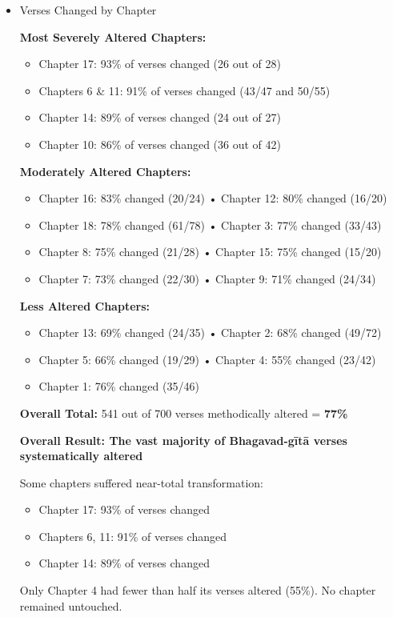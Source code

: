 \documentclass[11pt,twoside]{book}
\begin{document}
\newpage
\begin{itemize}
\item Verses Changed by Chapter
\label{sec:orgeeb8808}

\textbf{\textbf{Most Severely Altered Chapters:}}
\begin{itemize}
\item Chapter 17: 93\% of verses changed (26 out of 28)
\item Chapters 6 \& 11: 91\% of verses changed (43/47 and 50/55)
\item Chapter 14: 89\% of verses changed (24 out of 27)
\item Chapter 10: 86\% of verses changed (36 out of 42)
\end{itemize}

\textbf{\textbf{Moderately Altered Chapters:}}
\begin{itemize}
\item Chapter 16: 83\% changed (20/24) • Chapter 12: 80\% changed (16/20)
\item Chapter 18: 78\% changed (61/78) • Chapter 3: 77\% changed (33/43)
\item Chapter 8: 75\% changed (21/28) • Chapter 15: 75\% changed (15/20)
\item Chapter 7: 73\% changed (22/30) • Chapter 9: 71\% changed (24/34)
\end{itemize}

\textbf{\textbf{Less Altered Chapters:}}
\begin{itemize}
\item Chapter 13: 69\% changed (24/35) • Chapter 2: 68\% changed (49/72)
\item Chapter 5: 66\% changed (19/29) • Chapter 4: 55\% changed (23/42)
\item Chapter 1: 76\% changed (35/46)
\end{itemize}

\textbf{\textbf{Overall Total:}} 541 out of 700 verses methodically altered = \textbf{\textbf{77\%}}

\textbf{\textbf{\textbf{Overall Result: The vast majority of Bhagavad-gītā verses systematically altered}}}

Some chapters suffered near-total transformation:
\begin{itemize}
\item Chapter 17: 93\% of verses changed
\item Chapters 6, 11: 91\% of verses changed
\item Chapter 14: 89\% of verses changed
\end{itemize}

Only Chapter 4 had fewer than half its verses altered (55\%). No chapter remained untouched.
\end{itemize}
\end{document}
